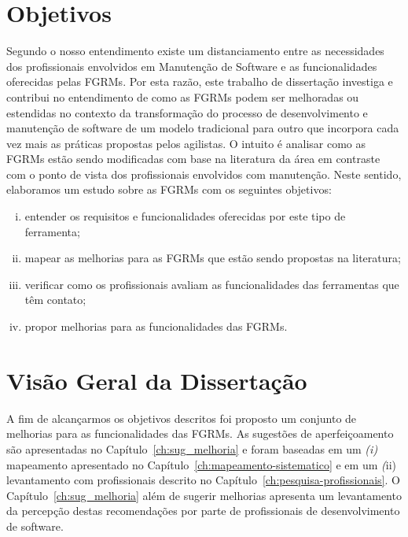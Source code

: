\section{Objetivos}
\label{sec:intro-objetivos}

Segundo o nosso entendimento existe um distanciamento entre as necessidades dos
profissionais envolvidos em Manutenção de Software e as funcionalidades
oferecidas pelas FGRMs\@. Por esta razão, este trabalho de dissertação investiga
e contribui no entendimento de como as FGRMs podem ser melhoradas ou estendidas
no contexto da transformação do processo de desenvolvimento e manutenção de
software de um modelo tradicional para outro que incorpora cada vez mais as
práticas propostas pelos agilistas. O intuito é analisar como as FGRMs estão
sendo modificadas com base na literatura da área em contraste com o ponto de
vista dos profissionais envolvidos com manutenção. Neste sentido, elaboramos um
estudo sobre as FGRMs com os seguintes objetivos:

\begin{enumerate}[(i)]
	\item entender os requisitos e funcionalidades oferecidas por este tipo de
        ferramenta;
	\item mapear as melhorias para as FGRMs que estão sendo propostas na
		literatura;
    \item verificar como os profissionais avaliam as funcionalidades das
        ferramentas que têm contato;
	\item propor melhorias para as funcionalidades das FGRMs\@.
\end{enumerate}


\section{Visão Geral da Dissertação}
\label{sec:intro-visao-geral}

A fim de alcançarmos os objetivos descritos foi proposto um conjunto de
melhorias para as funcionalidades das FGRMs. As sugestões de aperfeiçoamento são
apresentadas no Capítulo~\ref{ch:sug_melhoria} e foram baseadas em um
\textit{(i)} mapeamento apresentado no Capítulo~\ref{ch:mapeamento-sistematico}
e em um \textit(ii) levantamento com profissionais descrito no
Capítulo~\ref{ch:pesquisa-profissionais}. O Capítulo~\ref{ch:sug_melhoria} além
de sugerir melhorias apresenta um levantamento da percepção destas recomendações
por parte de profissionais de desenvolvimento de software.

